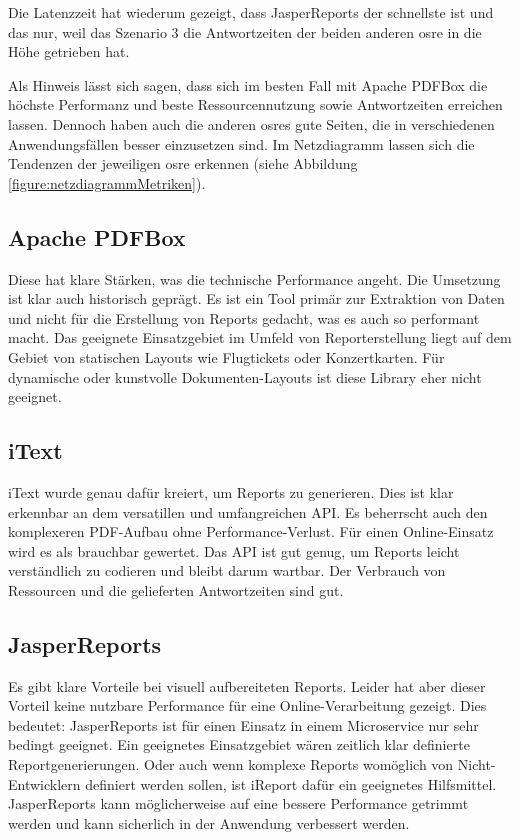 \documentclass[main.tex]{subfiles}
\begin{document}
Die Latenzzeit hat wiederum gezeigt, dass JasperReports der schnellste ist und das nur, weil das Szenario 3 die Antwortzeiten der beiden anderen \acrshort{osre} in die Höhe getrieben hat.

Als Hinweis lässt sich sagen, dass sich im besten Fall mit Apache PDFBox die höchste Performanz und beste Ressourcennutzung sowie Antwortzeiten erreichen lassen. Dennoch haben auch die anderen \acrshort{osre}s gute Seiten, die in verschiedenen Anwendungsfällen besser einzusetzen sind. Im Netzdiagramm lassen sich die Tendenzen der jeweiligen \acrshort{osre} erkennen (siehe Abbildung \ref{figure:netzdiagrammMetriken}).

\subsection{Apache PDFBox}
Diese hat klare Stärken, was die technische Performance angeht. Die Umsetzung ist klar auch historisch geprägt. Es ist ein Tool primär zur Extraktion von Daten und nicht für die Erstellung von Reports gedacht, was es auch so performant macht. Das geeignete Einsatzgebiet im Umfeld von Reporterstellung liegt auf dem Gebiet von statischen Layouts wie Flugtickets oder Konzertkarten. Für dynamische oder kunstvolle Dokumenten-Layouts ist diese Library eher nicht geeignet. 


\subsection{iText}

iText wurde genau dafür kreiert, um Reports zu generieren. Dies ist klar erkennbar an dem versatillen und umfangreichen API. Es beherrscht auch den komplexeren PDF-Aufbau ohne Performance-Verlust. Für einen Online-Einsatz wird es als brauchbar gewertet. Das API ist gut genug, um Reports leicht verständlich zu codieren und bleibt darum wartbar. Der Verbrauch von Ressourcen und die gelieferten Antwortzeiten sind gut. 



\subsection{JasperReports}
Es gibt klare Vorteile bei visuell aufbereiteten Reports. Leider hat aber dieser Vorteil keine nutzbare Performance für eine Online-Verarbeitung gezeigt. Dies bedeutet: JasperReports ist für einen Einsatz in einem Microservice nur sehr bedingt geeignet. Ein geeignetes Einsatzgebiet wären zeitlich klar definierte Reportgenerierungen. Oder auch wenn komplexe Reports womöglich von Nicht-Entwicklern definiert werden sollen, ist iReport dafür ein geeignetes Hilfsmittel. JasperReports kann möglicherweise auf eine bessere Performance getrimmt werden und kann sicherlich in der Anwendung verbessert werden. 
\end{document}
